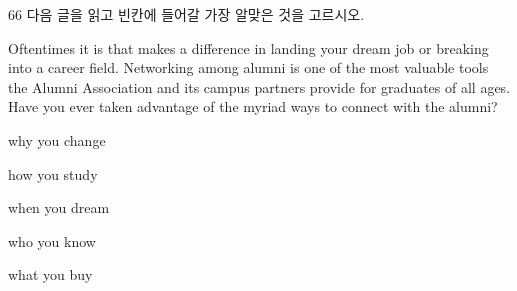 \begin{question}{66}
다음 글을 읽고 빈칸에 들어갈 가장 알맞은 것을 고르시오.
\begin{framedtext}
Oftentimes it is \blank{} that makes a difference in landing your dream job or breaking into a career field. Networking among alumni is one of the most valuable tools the Alumni Association and its campus partners provide for graduates of all ages. Have you ever taken advantage of the myriad ways to connect with the alumni?
\end{framedtext}
\begin{choices}
  \item why you change
  \item how you study
  \item when you dream
  \item who you know
  \item what you buy
\end{choices}
\end{question}
